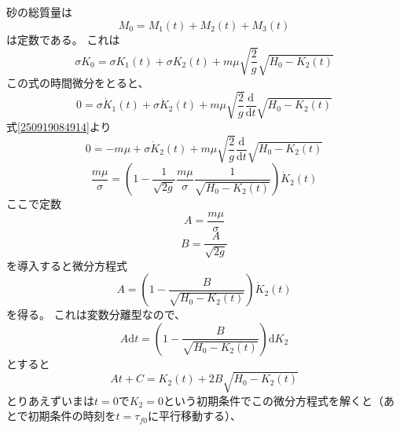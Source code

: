 \documentclass[dvipdfmx]{article}
\begin{document}
砂の総質量は
\begin{equation} \label{250917175922} 
   M_0 = M_1(t) + M_2(t) + M_3(t)
\end{equation}
は定数である。
これは
\begin{equation} \label{250919085544} 
   \sigma K_0 =  \sigma K_1(t) + \sigma K_2(t) + m\mu\sqrt{\frac{2}{g}}\sqrt{H_0-K_2(t)}
\end{equation}
この式の時間微分をとると、
\begin{equation} \label{250917180035} 
  0 = \sigma \dot{K}_1(t) +  \sigma \dot{K}_2(t)  + m\mu\sqrt{\frac{2}{g}} \frac{\mathrm{d} }{\mathrm{d} t}\sqrt{H_0-K_2(t)} %
\end{equation}
式\eqref{250919084914}より
\begin{equation} \label{250919085137} 
    0 =  -m\mu +  \sigma \dot{K}_2(t)  + m\mu\sqrt{\frac{2}{g}} \frac{\mathrm{d} }{\mathrm{d} t}\sqrt{H_0-K_2(t)}
\end{equation}
\begin{equation} \label{250917180242} 
   \frac{m \mu}{\sigma} =  \left(1 - \frac{1}{\sqrt{2g}}\frac{m \mu}{\sigma}  \frac{1}{\sqrt{H_0-K_2(t)}}\right) \dot{K}_2(t)
\end{equation}
ここで定数
\begin{equation} \label{250917180407} 
   A = \frac{m \mu}{\sigma}
\end{equation}
\begin{equation} \label{250917180426} 
   B  = \frac{A}{\sqrt{2g}}
\end{equation}
を導入すると微分方程式
\begin{equation} \label{250917180438} 
   A = \left(1 -   \frac{B}{\sqrt{H_0-K_2(t)}}\right) \dot{K}_2(t)
\end{equation}
を得る。
これは変数分離型なので、
\begin{equation} \label{250917180856} 
   A  \mathrm{d}t =  \left(1 -   \frac{B}{\sqrt{H_0-K_2(t)}}\right) \mathrm{d} K_2
\end{equation}
とすると
\begin{equation} \label{250917181005} 
   A t + C =  K_2(t) + 2B\sqrt{H_0-K_2(t)}
\end{equation}
とりあえずいまは$t=0$で$K_2=0$という初期条件でこの微分方程式を解くと（あとで初期条件の時刻を$t=\tau_{f0}$に平行移動する）、
\end{document}
